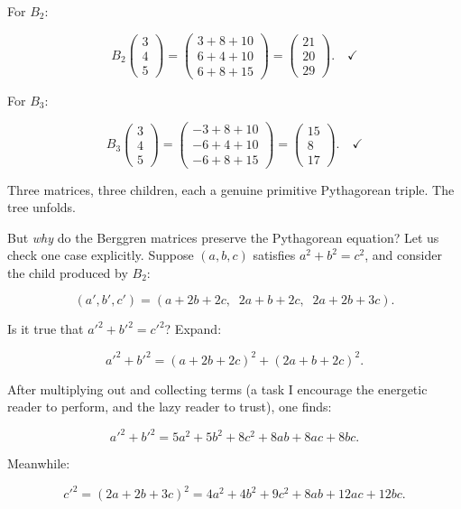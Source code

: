 For $B_2$:

\[B_2 \begin{pmatrix} 3 \\ 4 \\ 5 \end{pmatrix} = \begin{pmatrix} 3 + 8 + 10 \\ 6 + 4 + 10 \\ 6 + 8 + 15 \end{pmatrix} = \begin{pmatrix} 21 \\ 20 \\ 29 \end{pmatrix}. \quad \checkmark\]

For $B_3$:

\[B_3 \begin{pmatrix} 3 \\ 4 \\ 5 \end{pmatrix} = \begin{pmatrix} -3 + 8 + 10 \\ -6 + 4 + 10 \\ -6 + 8 + 15 \end{pmatrix} = \begin{pmatrix} 15 \\ 8 \\ 17 \end{pmatrix}. \quad \checkmark\]

Three matrices, three children, each a genuine primitive Pythagorean triple. The tree unfolds.


But \textit{why} do the Berggren matrices preserve the Pythagorean equation? Let us check one case explicitly. Suppose $(a, b, c)$ satisfies $a^2 + b^2 = c^2$, and consider the child produced by $B_2$:

\[(a', b', c') = (a + 2b + 2c, \;\; 2a + b + 2c, \;\; 2a + 2b + 3c).\]

Is it true that $a'^2 + b'^2 = c'^2$? Expand:

\[a'^2 + b'^2 = (a + 2b + 2c)^2 + (2a + b + 2c)^2.\]

After multiplying out and collecting terms (a task I encourage the energetic reader to perform, and the lazy reader to trust), one finds:

\[a'^2 + b'^2 = 5a^2 + 5b^2 + 8c^2 + 8ab + 8ac + 8bc.\]

Meanwhile:

\[c'^2 = (2a + 2b + 3c)^2 = 4a^2 + 4b^2 + 9c^2 + 8ab + 12ac + 12bc.\]


